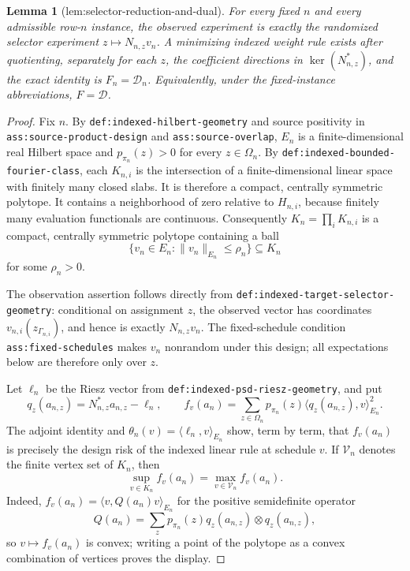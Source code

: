 \documentclass{article}
\newtheorem{lemma}{Lemma}
\begin{document}
\begin{lemma}[lem:selector-reduction-and-dual]\label{lem:selector-reduction-and-dual}
For every fixed \(n\) and every admissible row-\(n\) instance, the observed experiment is exactly the randomized selector experiment \(z\mapsto N_{n,z}v_n\). A minimizing indexed weight rule exists after quotienting, separately for each \(z\), the coefficient directions in \(\ker(N_{n,z}^{\ast})\), and the exact identity is \(F_n=\mathcal D_n\). Equivalently, under the fixed-instance abbreviations, \(F=\mathcal D\).
\end{lemma}
\begin{proof}
Fix \(n\).  By \texttt{def:indexed-hilbert-geometry} and source positivity in \texttt{ass:source-product-design} and \texttt{ass:source-overlap}, \(E_n\) is a finite-dimensional real Hilbert space and \(p_{\pi_n}(z)>0\) for every \(z\in\Omega_n\).  By \texttt{def:indexed-bounded-fourier-class}, each \(K_{n,i}\) is the intersection of a finite-dimensional linear space with finitely many closed slabs.  It is therefore a compact, centrally symmetric polytope.  It contains a neighborhood of zero relative to \(H_{n,i}\), because finitely many evaluation functionals are continuous.  Consequently \(K_n=\prod_iK_{n,i}\) is a compact, centrally symmetric polytope containing a ball
\[
 \{v_n\in E_n:\|v_n\|_{E_n}\le \rho_n\}\subseteq K_n
\]
for some \(\rho_n>0\).

The observation assertion follows directly from \texttt{def:indexed-target-selector-geometry}: conditional on assignment \(z\), the observed vector has coordinates \(v_{n,i}(z_{\Gamma_{n,i}})\), and hence is exactly \(N_{n,z}v_n\).  The fixed-schedule condition \texttt{ass:fixed-schedules} makes \(v_n\) nonrandom under this design; all expectations below are therefore only over \(z\).

Let \(\ell_n\) be the Riesz vector from \texttt{def:indexed-psd-riesz-geometry}, and put
\[
 q_z(a_{n,z})=N_{n,z}^{\ast}a_{n,z}-\ell_n,
 \qquad
 f_v(a_n)=\sum_{z\in\Omega_n}p_{\pi_n}(z)
       \langle q_z(a_{n,z}),v\rangle_{E_n}^{2}.
\]
The adjoint identity and \(\theta_n(v)=\langle\ell_n,v\rangle_{E_n}\) show, term by term, that \(f_v(a_n)\) is precisely the design risk of the indexed linear rule at schedule \(v\).  If \(\mathcal V_n\) denotes the finite vertex set of \(K_n\), then
\[
 \sup_{v\in K_n}f_v(a_n)=\max_{v\in\mathcal V_n}f_v(a_n).
\]
Indeed, \(f_v(a_n)=\langle v,Q(a_n)v\rangle_{E_n}\) for the positive semidefinite operator
\[
 Q(a_n)=\sum_zp_{\pi_n}(z)q_z(a_{n,z})\otimes q_z(a_{n,z}),
\]
so \(v\mapsto f_v(a_n)\) is convex; writing a point of the polytope as a convex combination of vertices proves the display.


\end{proof}
\end{document}

